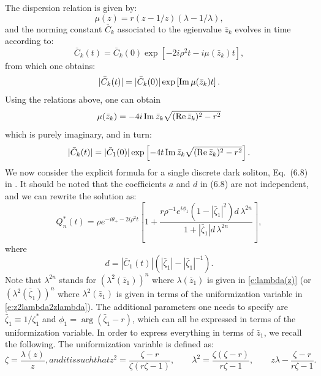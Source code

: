 \documentclass{article}
\def\Re{\mathop{\rm Re}\nolimits}
\def\Im{\mathop{\rm Im}\nolimits}
\begin{document}
The dispersion relation is given by:
\begin{equation}
\mu(z)=r(z-1/z)(\lambda-1/\lambda),    
\end{equation}
and the norming constant $\bar{C}_k$ associated to the egienvalue $\bar{z}_k$ evolves in time according to:
\begin{equation}
\bar{C}_k(t)=\bar{C}_k(0)\exp \left[-2i\rho^2 t-i\mu(\bar{z}_k)t \right],    
\end{equation}
from which one obtains:
\begin{equation}
|\bar{C}_k(t)|=|\bar{C}_k(0)|\exp \left[ \Im \mu(\bar{z}_k) t\right].   
\end{equation}
Using the relations above, one can obtain
\begin{equation}
\mu(\bar{z}_k)=-4i \Im \bar{z}_k\sqrt{(\Re \bar{z}_k)^2-r^2}    
\end{equation}
which is purely imaginary, and in turn:
\begin{equation}
|\bar{C}_k(t)|=|\bar{C}_1(0)|\exp \left[ -4t \Im \bar{z}_k \sqrt{(\Re \bar{z}_k)^2-r^2}   \right]. 
\end{equation}
We now consider the explicit formula for a single discrete dark soliton, Eq.~(6.8) in \cite{ABP07}. It should be noted that the coefficients $a$ and $d$ in (6.8) are not independent, and we can rewrite the solution as:
\begin{equation}
Q_n^*(t)=\rho e^{-i\theta_+ -2i\rho^2 t}\left[ 1+ \frac{r\rho^{-1}e^{i\phi_1}(1-|\bar{\zeta}_1|^2)d \, \lambda^{2n}}{1+|\bar{\zeta}_1|d\, \lambda^{2n}} \right],    
\end{equation}
where
\begin{equation}
d=|\bar{C}_1(t)|(|\bar{\zeta}_1|-|\bar{\zeta}_1|^{-1}).    
\end{equation}
Note that $\lambda^{2n}$ stands for $(\lambda^2(\bar{z}_1))^n$ where $\lambda(\bar{z}_1)$ is given in \eqref{e:lambda(z)} (or $(\lambda^2(\bar{\zeta}_1))^n$ where $\lambda^2(\bar{z}_1)$ is given in terms of the uniformization variable in \eqref{e:z2lambda2zlambda}).
The additional parameters one needs to specify are $\bar{\zeta}_1\equiv 1/\zeta_1^*$ and $\phi_1=\arg (\bar{\zeta}_1-r)$, which can all be expressed in terms of the uniformization variable. 
In order to express everything in terms of $\bar{z}_1$, we recall the following. The uniformization variable is defined as:
\begin{subequations}
\begin{equation}
\zeta=\frac{\lambda(z)}{z},    
\end{equation}
and it is such that
\begin{equation}
\label{e:z2lambda2zlambda}
z^2=\frac{\zeta-r}{\zeta(r\zeta-1)}, \qquad \lambda^2=\frac{\zeta(\zeta-r)}{r\zeta-1}, \qquad z\lambda-\frac{\zeta-r}{r\zeta-1}.    
\end{equation}
\end{subequations}
\end{document}
